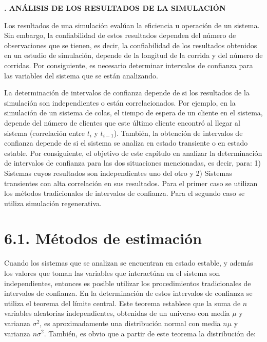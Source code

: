 \documentclass[11pt,letterpaper]{report}
\begin{document}
\begin{center}
{\LARGE\bfseries\linespread{1.3}. ANÁLISIS DE LOS RESULTADOS DE LA SIMULACIÓN\par}
\end{center}
\vspace{0.5cm}

\setcounter{chapter}{6}
\setcounter{page}{107}

Los resultados de una simulación evalúan la eficiencia u operación de un
sistema. Sin embargo, la confiabilidad de estos resultados dependen del
número de observaciones que se tienen, es decir, la confiabilidad de los
resultados obtenidos en un estudio de simulación, depende de la longitud
de la corrida y del número de corridas. Por consiguiente, es necesario
determinar intervalos de confianza para las variables del sistema que se
están analizando.

La determinación de intervalos de confianza depende de si los resultados
de la simulación son independientes o están correlacionados. Por
ejemplo, en la simulación de un sistema de colas, el tiempo de espera de
un cliente en el sistema, depende del número de clientes que este último
cliente encontró al llegar al sistema (correlación entre $t_i$ y
$t_{i-1}$). También, la obtención de intervalos de confianza depende de
si el sistema se analiza en estado transiente o en estado estable. Por
consiguiente, el objetivo de este capítulo en analizar la determinación
de intervalos de confianza para las dos situaciones mencionadas, es
decir, para: 1) Sistemas cuyos resultados son independientes uno del
otro y 2) Sistemas transientes con alta correlación en sus resultados.
Para el primer caso se utilizan los métodos tradicionales de intervalos
de confianza. Para el segundo caso se utiliza simulación regenerativa.

\section*{6.1. Métodos de estimación}

Cuando los sistemas que se analizan se encuentran en estado estable, y
además los valores que toman las variables que interactúan en el
sistema son independientes, entonces es posible utilizar los
procedimientos tradicionales de intervalos de confianza. En la
determinación de estos intervalos de confianza se utiliza el teorema
del límite central. Este teorema establece que la suma de $n$ variables
aleatorias independientes, obtenidas de un universo con media $\mu$ y
varianza $\sigma^2$, es aproximadamente una distribución normal con
media $n\mu$ y varianza $n\sigma^2$. También, es obvio que a partir de
este teorema la distribución de:
\end{document}
